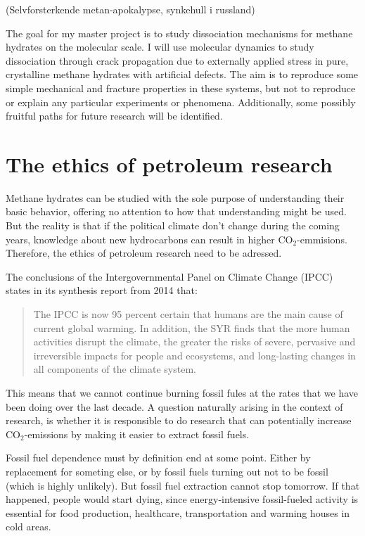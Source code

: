 (Selvforsterkende metan-apokalypse, synkehull i russland)

The goal for my master project is to study dissociation mechanisms for methane hydrates on the molecular scale. I will use molecular dynamics to study dissociation through crack propagation due to externally applied stress in pure, crystalline methane hydrates with artificial defects. The aim is to reproduce some simple mechanical and fracture properties in these systems, but not to reproduce or explain any particular experiments or phenomena. Additionally, some possibly fruitful paths for future research will be identified.

\section{The ethics of petroleum research}
Methane hydrates can be studied with the sole purpose of understanding their basic behavior, offering no attention to how that understanding might be used. But the reality is that if the political climate don't change during the coming years, knowledge about new hydrocarbons can result in higher CO$_2$-emmisions. Therefore, the ethics of petroleum research need to be adressed.

The conclusions of the Intergovernmental Panel on Climate Change (IPCC) states in its synthesis report from 2014 \cite{IPCC2014} that:

\begin{quotation}
The IPCC is now 95 percent certain that humans are the main cause of current global warming. In addition, the SYR finds that the more human activities disrupt the climate, the greater the risks of severe, pervasive and irreversible impacts for people and ecosystems, and long-lasting changes in all components of the climate system. 
\end{quotation}

This means that we cannot continue burning fossil fules at the rates that we have been doing over the last decade. A question naturally arising in the context of research, is whether it is responsible to do research that can potentially increase CO$_2$-emissions by making it easier to extract fossil fuels.

Fossil fuel dependence must by definition end at some point. Either by replacement for someting else, or by fossil fuels turning out not to be fossil (which is highly unlikely). But fossil fuel extraction cannot stop tomorrow. If that happened, people would start dying, since energy-intensive fossil-fueled activity is essential for food production, healthcare, transportation and warming houses in cold areas.


